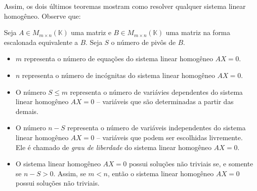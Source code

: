 Assim, os dois últimos teoremas mostram como resolver qualquer sistema linear homogêneo.
Observe que:

\begin{proposition}
    Seja $A \in M_{m \times n}(\mathbb K)$ uma matriz e $B \in M_{m \times n}(\mathbb K)$ uma matriz na forma escalonada equivalente a $B$.
    Seja $S$ o número de pivôs de $B$.

    \begin{itemize}
        \item $m$ representa o número de equações do sistema linear homogêneo $AX=0$.
        \item $n$ representa o número de incógnitas do sistema linear homogêneo $AX=0$.
        \item O número $S\leq m$ representa o número de variávies dependentes do sistema linear homogêneo $AX=0$ -- variáveis que são determinadas a partir das demais.
        \item O número $n-S$ representa o número de variáveis independentes do sistema linear homogêneo $AX=0$ -- variáveis que podem ser escolhidas livremente. Ele é chamado de \emph{grau de liberdade} do sistema linear homogêneo $AX=0$.
        \item O sistema linear homogêneo $AX=0$ possui soluções não triviais se, e somente se $n-S>0$. Assim, se $m<n$, então o sistema linear homogêneo $AX=0$ possui soluções não triviais.
    \end{itemize}
\end{proposition}